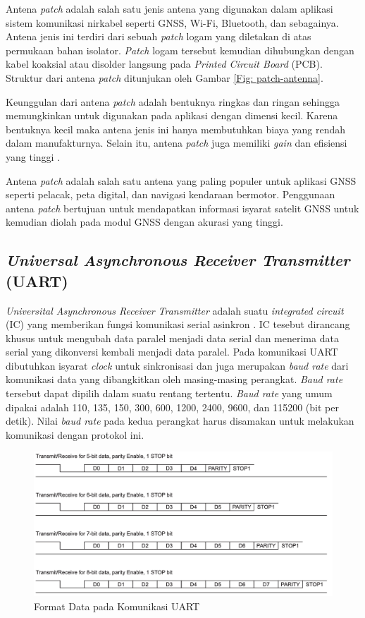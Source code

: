 Antena \textit{patch} adalah salah satu jenis antena yang digunakan dalam aplikasi sistem komunikasi nirkabel seperti GNSS, Wi-Fi, Bluetooth, dan sebagainya. Antena jenis ini terdiri dari sebuah \textit{patch} logam yang diletakan di atas permukaan bahan isolator. \textit{Patch} logam tersebut kemudian dihubungkan dengan kabel koaksial atau disolder langsung pada \textit{Printed Circuit Board} (PCB). Struktur dari antena \textit{patch} ditunjukan oleh Gambar \ref{Fig: patch-antenna}.

Keunggulan dari antena \textit{patch} adalah bentuknya ringkas dan ringan sehingga memungkinkan untuk digunakan pada aplikasi dengan dimensi kecil. Karena bentuknya kecil maka antena jenis ini hanya membutuhkan biaya yang rendah dalam manufakturnya. Selain itu, antena \textit{patch} juga memiliki \textit{gain} dan efisiensi yang tinggi \cite{Ding2020}.

Antena \textit{patch} adalah salah satu antena yang paling populer untuk aplikasi GNSS seperti pelacak, peta digital, dan navigasi kendaraan bermotor. Penggunaan antena \textit{patch} bertujuan untuk mendapatkan informasi isyarat satelit GNSS untuk kemudian diolah pada modul GNSS dengan akurasi yang tinggi.

\subsection{\textit{Universal Asynchronous Receiver Transmitter} (UART)}
\textit{Universital Asynchronous Receiver Transmitter} adalah suatu \textit{integrated circuit} (IC) yang memberikan fungsi komunikasi serial asinkron \cite{ti2010}. IC tesebut dirancang khusus untuk mengubah data paralel menjadi data serial dan menerima data serial yang dikonversi kembali menjadi data paralel. Pada komunikasi UART dibutuhkan isyarat \textit{clock} untuk sinkronisasi dan juga merupakan \textit{baud rate} dari komunikasi data yang dibangkitkan oleh masing-masing perangkat. \textit{Baud rate} tersebut dapat dipilih dalam suatu rentang tertentu. \textit{Baud rate} yang umum dipakai adalah 110, 135, 150, 300, 600, 1200, 2400, 9600, dan 115200 (bit per detik). Nilai \textit{baud rate} pada kedua perangkat harus disamakan untuk melakukan komunikasi dengan protokol ini.

\begin{figure}[H]
	\centering
	\includegraphics[width=12cm]{contents/chapter-2/uart-format.png}
	\caption{Format Data pada Komunikasi UART \cite{ti2010}}
	\label{Fig: uart-format}
\end{figure}

